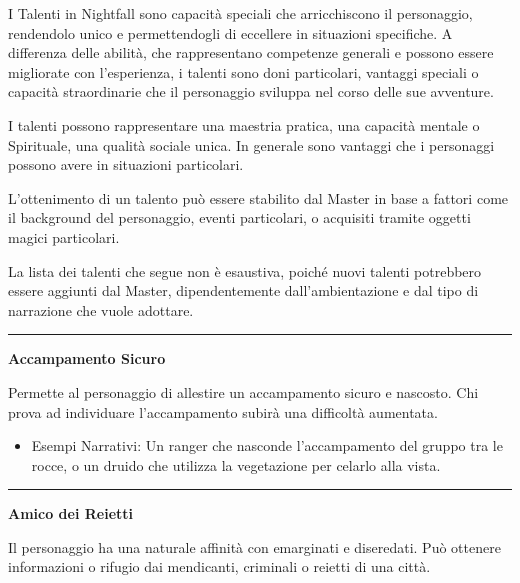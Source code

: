 \documentclass[../manuale_main.tex]{subfiles}
\begin{document}
I Talenti in Nightfall sono capacità speciali che arricchiscono il personaggio, rendendolo unico e permettendogli di eccellere in situazioni specifiche. A differenza delle abilità, che rappresentano competenze generali e possono essere migliorate con l’esperienza, i talenti sono doni particolari, vantaggi speciali o capacità straordinarie che il personaggio sviluppa nel corso delle sue avventure.

I talenti possono rappresentare una maestria pratica, una capacità mentale o Spirituale, una qualità sociale unica. In generale sono vantaggi che i personaggi possono avere in situazioni particolari.

L'ottenimento di un talento può essere stabilito dal Master in base a fattori come il background del personaggio, eventi particolari, o acquisiti tramite oggetti magici particolari.

La lista dei talenti che segue non è esaustiva, poiché nuovi talenti potrebbero essere aggiunti dal Master, dipendentemente dall'ambientazione e dal tipo di narrazione che vuole adottare.

\vspace{0.5cm}
\noindent
\begin{center}
\rule{\textwidth}{0.4pt} 
\end{center}
\vspace{0.5cm}



\begin{center}
\textbf{\large{Accampamento Sicuro}}\\
\end{center}
Permette al personaggio di allestire un accampamento sicuro e nascosto. Chi prova ad individuare l'accampamento subirà una difficoltà aumentata.

\begin{itemize}
\item Esempi Narrativi: Un ranger che nasconde l'accampamento del gruppo tra le rocce, o un druido che utilizza la vegetazione per celarlo alla vista.
\end{itemize}

\vspace{0.5cm}
\noindent
\begin{center}
\rule{\textwidth}{0.4pt} 
\end{center}
\vspace{0.5cm}

\begin{center}
\textbf{\large{Amico dei Reietti}}\\
\end{center}
Il personaggio ha una naturale affinità con emarginati e diseredati. Può ottenere informazioni o rifugio dai mendicanti, criminali o reietti di una città.
\end{document}
